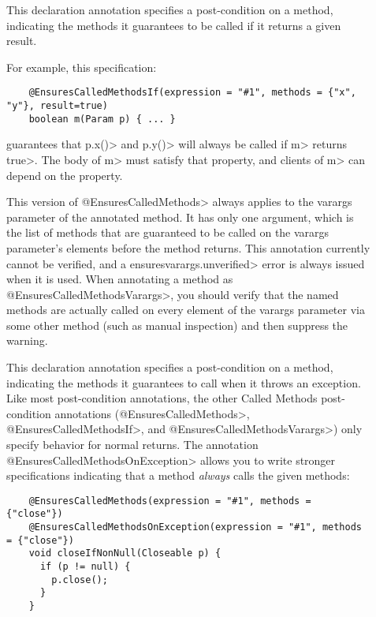 \begin{description}
\item[]
  This declaration annotation specifies a post-condition on a method, indicating the methods it
  guarantees to be called if it returns a given result.

  For example, this specification:

  \begin{Verbatim}
    @EnsuresCalledMethodsIf(expression = "#1", methods = {"x", "y"}, result=true)
    boolean m(Param p) { ... }
  \end{Verbatim}

  guarantees that \<p.x()> and \<p.y()> will always be called if \<m> returns \<true>.
  The body of \<m> must satisfy that property, and clients of \<m> can depend on the property.

\item[]
  This version of \<@EnsuresCalledMethods> always applies to the varargs parameter of the
  annotated method. It has only one argument, which is the list of methods that are guaranteed
  to be called on the varargs parameter's elements before the method returns. This annotation
  currently cannot be verified, and a \<ensuresvarargs.unverified> error is always issued
  when it is used. When annotating a method as \<@EnsuresCalledMethodsVarargs>, you should verify
  that the named methods are actually called on every element of the varargs parameter via some
  other method (such as manual inspection) and then suppress the warning.

\item[]
  This declaration annotation specifies a post-condition on a method, indicating the methods it
  guarantees to call when it throws an exception.  Like most post-condition annotations, the
  other Called Methods post-condition annotations (\<@EnsuresCalledMethods>,
  \<@EnsuresCalledMethodsIf>, and \<@EnsuresCalledMethodsVarargs>) only specify behavior for
  normal returns.  The annotation \<@EnsuresCalledMethodsOnException> allows you to write
  stronger specifications indicating that a method \emph{always} calls the given methods:

  \begin{Verbatim}
    @EnsuresCalledMethods(expression = "#1", methods = {"close"})
    @EnsuresCalledMethodsOnException(expression = "#1", methods = {"close"})
    void closeIfNonNull(Closeable p) {
      if (p != null) {
        p.close();
      }
    }
  \end{Verbatim}


\end{description}

